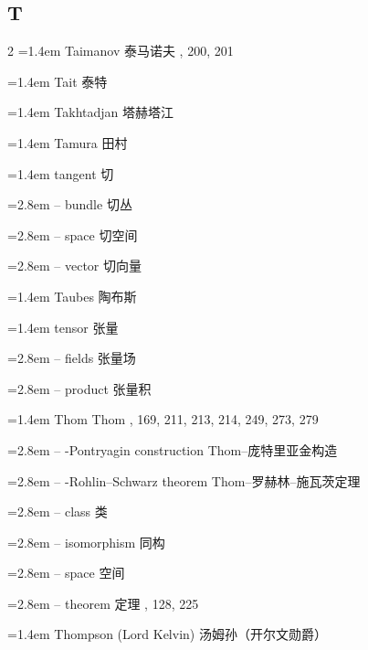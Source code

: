 \subsection*{T}
\small
\begin{multicols}{2}
\noindent\hangindent=1.4em Taimanov \quad 泰马诺夫 , 200, 201\par
\noindent\hangindent=1.4em Tait \quad 泰特 \par
\noindent\hangindent=1.4em Takhtadjan \quad 塔赫塔江 \par
\noindent\hangindent=1.4em Tamura \quad 田村 \par
\noindent\hangindent=1.4em tangent \quad 切 \quad\par
\noindent\hangindent=2.8em -- bundle \quad 切丛 \par
\noindent\hangindent=2.8em -- space \quad 切空间 \par
\noindent\hangindent=2.8em -- vector \quad 切向量 \par
\noindent\hangindent=1.4em Taubes \quad 陶布斯 \par
\noindent\hangindent=1.4em tensor \quad 张量 \quad\par
\noindent\hangindent=2.8em -- fields \quad 张量场 \par
\noindent\hangindent=2.8em -- product \quad 张量积 \par
\noindent\hangindent=1.4em Thom \quad Thom , 169, 211, 213, 214, 249, 273, 279\par
\noindent\hangindent=2.8em -- -Pontryagin construction \quad Thom--庞特里亚金构造 \par
\noindent\hangindent=2.8em -- -Rohlin--Schwarz theorem \quad Thom--罗赫林--施瓦茨定理 \par
\noindent\hangindent=2.8em -- class \quad 类 \par
\noindent\hangindent=2.8em -- isomorphism \quad 同构 \par
\noindent\hangindent=2.8em -- space \quad 空间 \par
\noindent\hangindent=2.8em -- theorem \quad 定理 , 128, 225\par
\noindent\hangindent=1.4em Thompson (Lord Kelvin) \quad 汤姆孙（开尔文勋爵） \par

\end{multicols}
